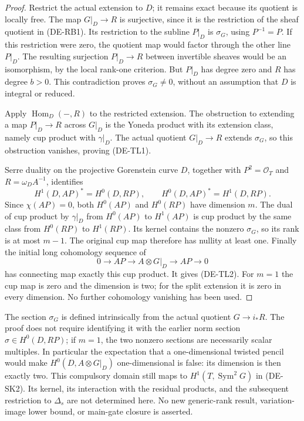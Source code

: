 \begin{proof}
Restrict the actual extension to $D$; it remains exact because its
quotient is locally free. The map $G|_D\to R$ is surjective, since
it is the restriction of the sheaf quotient in (DE-RB1). Its restriction
to the subline $P|_D$ is $\sigma_G$, using $P^{-1}=P$.
If this restriction were zero, the quotient map would factor through
the other line $P|_D$. The resulting surjection $P|_D\to R$ between
invertible sheaves would be an isomorphism, by the local rank-one
criterion. But $P|_D$ has degree zero and $R$ has degree $b>0$.
This contradiction proves $\sigma_G\ne0$, without an assumption that
$D$ is integral or reduced.

Apply $\operatorname{Hom}_D(-,R)$ to the restricted extension.
The obstruction to extending a map $P|_D\to R$ across $G|_D$ is
the Yoneda product with its extension class, namely cup product
with $\gamma|_D$. The actual quotient $G|_D\to R$ extends
$\sigma_G$, so this obstruction vanishes, proving (DE-TL1).

Serre duality on the projective Gorenstein curve $D$, together with
$P^2=\mathcal O_T$ and $R=\omega_D A^{-1}$, identifies
\[
H^1(D,AP)^*=H^0(D,RP),\qquad
H^0(D,AP)^*=H^1(D,RP).
\]
Since $\chi(AP)=0$, both $H^0(AP)$ and $H^0(RP)$ have dimension $m$.
The dual of cup product by $\gamma|_D$ from $H^0(AP)$ to $H^1(AP)$
is cup product by the same class from $H^0(RP)$ to $H^1(RP)$.
Its kernel contains the nonzero $\sigma_G$, so its rank is at most
$m-1$. The original cup map therefore has nullity at least one.
Finally the initial long cohomology sequence of
\[
0\longrightarrow AP\longrightarrow A\otimes G|_D
                    \longrightarrow AP\longrightarrow0
\]
has connecting map exactly this cup product. It gives (DE-TL2).
For $m=1$ the cup map is zero and the dimension is two; for the
split extension it is zero in every dimension. No further
cohomology vanishing has been used.
\end{proof}

\begin{remark}
\label{rem:DE-A3-twisted-pencil-lift-scope}
The section $\sigma_G$ is defined intrinsically from the actual
quotient $G\to i_*R$. The proof does not require identifying it with
the earlier norm section $\sigma\in H^0(D,RP)$; if $m=1$, the two
nonzero sections are necessarily scalar multiples. In particular
the expectation that a one-dimensional twisted pencil would make
$H^0(D,A\otimes G|_D)$ one-dimensional is false: its dimension is
then exactly two. This compulsory domain still maps to
$H^1(T,\operatorname{Sym}^2G)$ in (DE-SK2). Its kernel, its
interaction with the residual products, and the subsequent restriction
to $\Delta_s$ are not determined here. No new generic-rank result,
variation-image lower bound, or main-gate closure is asserted.
\end{remark}
